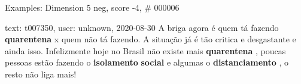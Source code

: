 \begin{frame}{Examples: Dimension 5 neg, score -4, \# 000006}
\footnotesize
\begin{alertblock}{text: t007350, user: unknown, 2020-08-30}
A briga agora é quem tá fazendo \textbf{quarentena} x quem não tá fazendo. A 
situação já é tão critica e desgastante e ainda isso. Infelizmente hoje no 
Brasil não existe mais \textbf{quarentena} , poucas pessoas estão fazendo o 
\textbf{isolamento} \textbf{social} e algumas o \textbf{distanciamento} , o 
resto não liga mais! 
\end{alertblock}
\end{frame}
